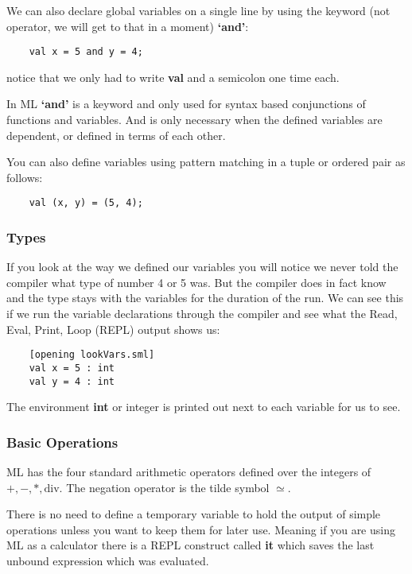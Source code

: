 We can also declare global variables on a single line by using the keyword (not operator, we will get to that in a moment) \textbf{`and'}:

\begin{verbatim}
    val x = 5 and y = 4;
\end{verbatim}

notice that we only had to write \textbf{val} and a semicolon one time each. 

In ML \textbf{`and'} is a keyword and only used for syntax based conjunctions of functions and variables. And is only necessary when the defined variables are dependent, or defined in terms of each other. 

You can also define variables using pattern matching in a tuple or ordered pair as follows:

\begin{verbatim}
    val (x, y) = (5, 4);
\end{verbatim}

\subsubsection{Types}

If you look at the way we defined our variables you will notice we never told the compiler what type of number 4 or 5 was. But the compiler does in fact know and the type stays with the variables for the duration of the run. We can see this if we run the variable declarations through the compiler and see what the Read, Eval, Print, Loop (REPL) output shows us:

\begin{verbatim}
    [opening lookVars.sml]
    val x = 5 : int
    val y = 4 : int
\end{verbatim}

The environment \textbf{int} or integer is printed out next to each variable for us to see. 

\subsubsection{Basic Operations}

ML has the four standard arithmetic operators defined over the integers of $+, -, *, \text{div}$. The negation operator is the tilde symbol $\simeq$. 

There is no need to define a temporary variable to hold the output of simple operations unless you want to keep them for later use. Meaning if you are using ML as a calculator there is a REPL construct called \textbf{it} which saves the last unbound expression which was evaluated. 

